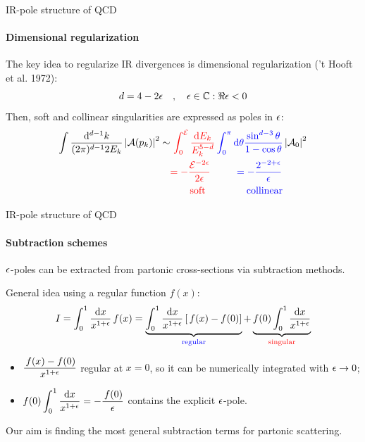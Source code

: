 
\begin{frame}[noframenumbering]{IR-pole structure of QCD}
  \framesubtitle{Dimensional regularization}

  \justifying
  The key idea to regularize IR divergences is dimensional regularization ('t Hooft et al. 1972):
  \begin{equation*}
    d = 4 - 2 \epsilon
    \quad , \quad
    \epsilon \in \mathbb{C} : \Re{\epsilon} < 0
  \end{equation*}
  Then, soft and collinear singularities are expressed as poles in $ \epsilon $:
  \begin{equation*}
    \begin{split}
      \int \frac{\dd^{d-1}k}{(2\pi)^{d-1} 2E_k} \abs{\ampl(p_k)}^2 \sim
      & \,\, \textcolor{red}{\int_0^{\ema} \frac{\dd E_k}{E_k^{5-d}}} \, \textcolor{blue}{\int_0^\pi \dd \theta \frac{\sin^{d-3} \theta}{1 - \cos \theta}} \abs{\ampl_0}^2 \\
      & \textcolor{red}{= - \frac{\ema^{-2\de}}{2\de}} \qquad \,\,\ \textcolor{blue}{= - \frac{2^{-2 + \de}}{\de}} \\
      & \quad \quad \textcolor{red}{\text{soft}} \qquad \qquad \, \textcolor{blue}{\text{collinear}}
    \end{split}
  \end{equation*}

\end{frame}


\begin{frame}{IR-pole structure of QCD}
  \framesubtitle{Subtraction schemes}

  $ \epsilon $-poles can be extracted from partonic cross-sections via subtraction methods.

  General idea using a regular function $ f(x) $:
  \begin{equation*}
    I = \int_0^1 \frac{\mathrm{d} x}{x^{1 + \epsilon}} \,f(x) = \underbrace{\int_0^1 \frac{\mathrm{d} x}{x^{1 + \epsilon}} \left[ \,f(x) - f(0) \right]}_{\textcolor{blue}{\text{regular}}} + \underbrace{f(0) \int_0^1 \frac{\mathrm{d} x}{x^{1 + \epsilon}}}_{\textcolor{red}{\text{singular}}}
  \end{equation*}
  \vspace{-1em}
  \begin{itemize}
    \item $ \displaystyle \frac{\,f(x) - f(0)}{x^{1 + \epsilon}} $ regular at $ x = 0 $, so it can be numerically integrated with $ \epsilon \rightarrow 0 $;
    \item $ \displaystyle f(0) \int_0^1 \frac{\mathrm{d} x}{x^{1 + \epsilon}} = - \frac{\,f(0)}{\epsilon} $ contains the explicit $ \epsilon $-pole.
  \end{itemize}

  Our aim is finding the most general subtraction terms for partonic scattering.

\end{frame}

